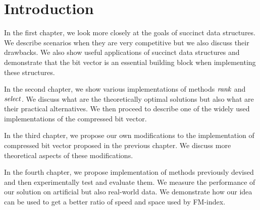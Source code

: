\chapter*{Introduction} %

In the first chapter, we look more closely at the goals of succinct data structures.
We describe scenarios when they are very competitive but we also discuss their drawbacks.
We also show useful applications of succinct data structures and demonstrate that the bit
vector is an essential building block when implementing these structures.

In the second chapter, we show various implementations of methods $\mathit{rank}$ and $\mathit{select}$.
We discuss what are the theoretically optimal solutions but also what are their practical
alternatives. We then proceed to describe one of the widely used implementations of the
compressed bit vector.

In the third chapter, we propose our own modifications to the implementation of compressed bit
vector proposed in the previous chapter. We discuss more theoretical aspects of these modifications.

In the fourth chapter, we propose implementation of methods previously devised and then experimentally
test and evaluate them. We measure the performance of our solution on artificial but also real-world
data. We demonstrate how our idea can be used to get a better ratio of speed and space used by FM-index.